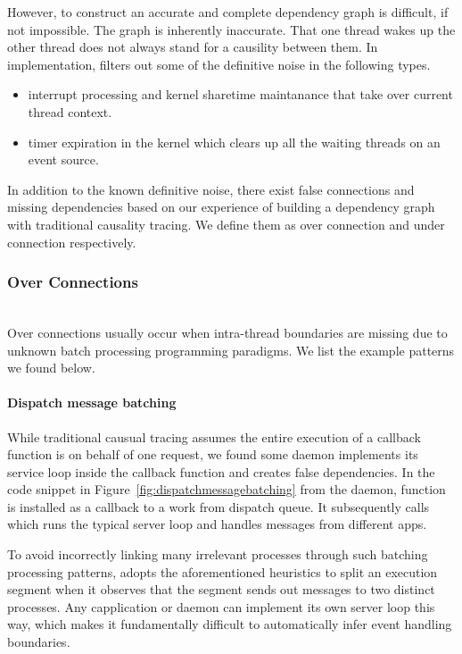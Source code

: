 However, to construct an accurate and complete dependency graph is difficult,
if not impossible. The graph is inherently inaccurate. That one thread wakes
up the other thread does not always stand for a causility between them. In
implementation, \xxx filters out some of the definitive noise in the following
types.

\begin{itemize}

\item interrupt processing and kernel sharetime maintanance that take over
current thread context.

\item timer expiration in the kernel which clears up all the waiting threads on
an event source.

\end{itemize}

In addition to the known definitive noise, there exist false connections and
missing dependencies based on our experience of building a dependency graph
with traditional causality tracing. We define them as over connection and under
connection respectively.

\subsubsection{Over Connections}\hfill\\
Over connections usually occur when intra-thread boundaries are missing due to
unknown batch processing programming paradigms. We list the example patterns we
found below.

\paragraph{Dispatch message batching}
While traditional causual tracing assumes the entire execution of a callback
function is on behalf of one request, we found some daemon implements its
service loop inside the callback function and creates false dependencies. In the
code snippet in Figure~\ref{fig:dispatchmessagebatching} from the 
daemon, function  is installed as a callback to a work
from dispatch queue. It subsequently calls  which
runs the typical server loop and handles messages from different apps.

To avoid incorrectly linking many irrelevant processes through such batching
processing patterns, \xxx adopts the aforementioned heuristics to split an
execution segment when it observes that the segment sends out messages to two
distinct processes. Any capplication or daemon can implement its own server loop
this way, which makes it fundamentally difficult to automatically infer event
handling boundaries.

